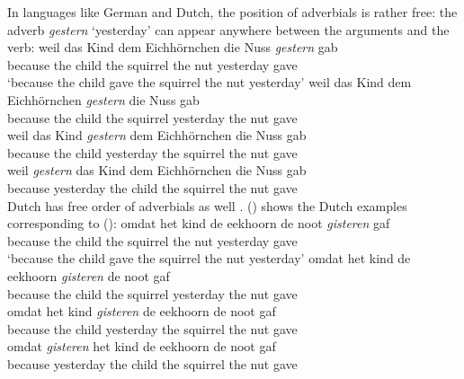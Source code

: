 In languages like German and Dutch, the position of adverbials is rather free: the adverb \emph{gestern}
`yesterday' can appear anywhere between the arguments and the verb:
\eal
\ex
\gll weil das Kind dem Eichhörnchen die Nuss \emph{gestern} gab\\ 
     because the child the squirrel the nut yesterday gave\\\german
\glt `because the child gave the squirrel the nut yesterday'
\ex 
\gll weil das Kind dem Eichhörnchen \emph{gestern} die Nuss gab\\
     because the child the squirrel yesterday the nut gave\\
\ex 
\gll weil das Kind \emph{gestern} dem Eichhörnchen die Nuss gab\\
     because the child yesterday the squirrel the nut gave\\
\ex 
\gll weil \emph{gestern} das Kind dem Eichhörnchen die Nuss gab\\
     because yesterday the child the squirrel the nut gave\\
\zl
Dutch has free order of adverbials as well \parencites[]{Koster99a-u}[Section~6]{Bouma2003a-u}. () shows the Dutch examples corresponding to ():
\eal
\ex
\gll omdat het kind de eekhoorn de noot \emph{gisteren} gaf\\ 
     because the child the squirrel the nut yesterday gave\\\dutch
\glt `because the child gave the squirrel the nut yesterday'
\ex 
\gll omdat het kind de eekhoorn \emph{gisteren} de noot gaf\\
     because the child the squirrel yesterday the nut gave\\
\ex 
\gll omdat het kind \emph{gisteren} de eekhoorn de noot gaf\\
     because the child yesterday the squirrel the nut gave\\
\ex 
\gll omdat \emph{gisteren} het kind de eekhoorn de noot gaf\\
     because yesterday the child the squirrel the nut gave\\
\zl



